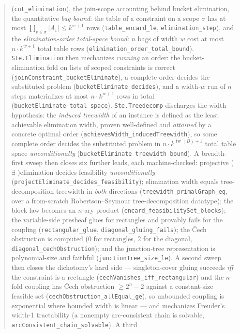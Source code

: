 \documentclass[11pt]{article}
\newcommand{\lean}[1]{\texttt{#1}}
\begin{document}
\begin{abstract}
(\lean{cut\_elimination}), the join-scope accounting behind bucket
elimination, the quantitative \emph{bag bound}: the table of a
constraint on a scope $\sigma$ has at most $\prod_{v \in \sigma}
|A_v| \le k^{w+1}$ rows (\lean{table\_encard\_le},
\lean{elimination\_step}), and the \emph{elimination-order total-space
bound}: $n$ bags of width $w$ cost at most $n \cdot k^{w+1}$ total
table rows (\lean{elimination\_order\_total\_bound}).
\lean{Ste.Elimination} then mechanizes \emph{running} an order: the
bucket-elimination fold on lists of scoped constraints is correct
(\lean{joinConstraint\_bucketEliminate}), a complete order decides the
substituted problem (\lean{bucketEliminate\_decides}), and a width-$w$
run of $n$ steps materializes at most $n \cdot k^{w+1}$ rows in total
(\lean{bucketEliminate\_total\_space}).  \lean{Ste.Treedecomp}
discharges the width hypothesis: the \emph{induced treewidth} of an
instance is defined as the least achievable elimination width, proven
well-defined and \emph{attained} by a concrete optimal order
(\lean{achievesWidth\_inducedTreewidth}), so some complete order
decides the substituted problem in $n \cdot
k^{\operatorname{tw}(B)+1}$ total table space \emph{unconditionally}
(\lean{bucketEliminate\_treewidth\_bound}).  A breadth-first sweep then
closes six further leads, each machine-checked: projective
($\exists$-)elimination decides feasibility \emph{unconditionally}
(\lean{projectEliminate\_decides\_feasibility}); elimination width
equals tree-decomposition treewidth in \emph{both} directions
(\lean{treewidth\_primalGraph\_eq}, over a from-scratch
Robertson--Seymour tree-decomposition datatype); the block law becomes
an $n$-ary product (\lean{encard\_feasibilitySet\_blocks}); the
variable-side presheaf glues for rectangles and provably fails for the
coupling (\lean{rectangular\_glue}, \lean{diagonal\_gluing\_fails}); the
\v{C}ech obstruction is computed ($0$ for rectangles, $2$ for the
diagonal, \lean{diagonal\_cechObstruction}); and the junction-tree
representation is polynomial-size and faithful
(\lean{junctionTree\_size\_le}).  A second sweep then closes the
dichotomy's hard side --- singleton-cover gluing succeeds \emph{iff} the
constraint is a rectangle (\lean{cechVanishes\_iff\_rectangular}) and the
$n$-fold coupling has \v{C}ech obstruction $\ge 2^n - 2$ against a
constant-size feasible set (\lean{cechObstruction\_allEqual\_ge}), so
unbounded coupling is exponential where bounded width is linear --- and
mechanizes Freuder's width-1 tractability (a nonempty arc-consistent
chain is solvable, \lean{arcConsistent\_chain\_solvable}).  A third

\end{abstract}
\end{document}
